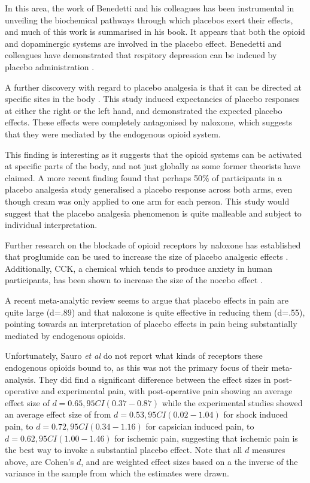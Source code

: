 In this area, the work of Benedetti and his colleagues has been instrumental in unveiling the biochemical pathways through which placebos exert their effects, and much of this work is summarised in his book.  It appears that both the opioid and dopaminergic systems are involved in the placebo effect.  Benedetti and colleagues have demonstrated that respitory depression can be indcued by placebo administration \cite{Benedetti1999a}. 

A further discovery with regard to placebo analgesia is that it can be directed at specific sites in the body \cite{Benedetti1999}. This study induced expectancies of placebo responses at either the right or the left hand, and demonstrated the expected placebo effects. These effects were completely antagonised by naloxone, which suggests that they were mediated by the endogenous opioid system. 

This finding is interesting as it suggests that the opioid systems can be activated at specific parts of the body, and not just globally as some former theorists have claimed. A more recent finding \cite{Watson2006} found that perhaps 50\% of participants in a placebo analgesia study generalised a placebo response across both arms, even though cream was only applied to one arm for each person. This study would suggest that the placebo analgesia phenomenon is quite malleable and subject to individual interpretation. 

Further research on the blockade of opioid receptors by naloxone has established that proglumide can be used to increase the size of placebo analgesic effects \cite{Benedetti1995}. Additionally, CCK, a chemical which tends to produce anxiety in human participants, has been shown to increase the size of the nocebo effect \cite{Benedetti1996}. 

A recent meta-analytic review \cite{Sauro2005} seems to argue that placebo effects in pain are quite large (d=.89) and that naloxone is quite effective in reducing them (d=.55), pointing towards an interpretation of placebo effects in pain being substantially mediated by endogenous opioids. 

Unfortunately, Sauro \textit{et al} do not report what kinds of receptors these endogenous opioids bound to, as this was not the primary focus of their meta-analysis. They did find a significant difference between the effect sizes in post-operative and experimental pain, with post-operative pain showing an average effect size of $d=0.65, 95CI(0.37-0.87)$ while the experimental studies showed an average effect size of from $d=0.53, 95CI(0.02-1.04)$ for shock induced pain, to $d=0.72, 95CI(0.34-1.16)$ for capsician induced pain, to $d=0.62, 95CI(1.00-1.46)$ for ischemic pain, suggesting that ischemic pain is the best way to invoke a substantial placebo effect. Note that all $d$ measures above, are Cohen's $d$, and are weighted effect sizes based on a the inverse of the variance in the sample from which the estimates were drawn. 

